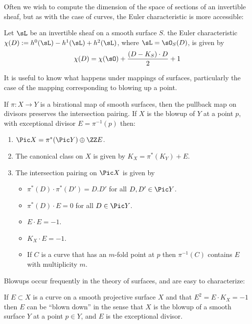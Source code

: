 Often we wish to compute the dimension of the space of sections of an invertible sheaf, but
as with the case of curves, the Euler characteristic is more accessible:

\begin{theorem} Let $\sL$ be an invertible sheaf on a smooth surface $S$.
the Euler characteristic $\chi(D) := h^0(\sL)-h^1(\sL)+h^2(\sL)$, where $\sL = \sO_S(D)$, is given by
$$
\chi(D) = \chi(\sO) + \frac{(D-K_S)\cdot D}{2}+1
$$
\end{theorem}


It is useful to know what happens under mappings of surfaces, particularly the case of the mapping
corresponding to blowing up a point.

\begin{theorem}
If $\pi: X \to Y$ is a birational map of smooth surfaces, then the pullback map on divisors
preserves the intersection pairing. If $X$ is the blowup of $Y$ at a point $p$, with exceptional
divisor $E = \pi^{-1}(p)$ then:

\begin{enumerate}
 \item $\Pic X =\pi^*(\Pic Y) \oplus \ZZ E$.
\item The canonical class on $X$ is given by $K_X = \pi^*(K_Y)+E$.
 \item The intersection pairing on $\Pic X$ is given by
 
\begin{itemize}
\item $\pi^*(D)\cdot\pi^*(D') = D.D'$ for all $D,D'\in \Pic Y$.
\item $\pi^*(D)\cdot E = 0$ for all $D\in \Pic Y$.
 \item $E\cdot E = -1$.
 \item $K_X\cdot E = -1$.
 \item If $C$ is a curve that has an $m$-fold point at $p$ then $\pi^{-1}(C)$ contains $E$ with multiplicity $m$.
 \end{itemize}
\end{enumerate}
\end{theorem}

Blowups occur frequently in the theory of surfaces, and are easy to characterize:
\begin{theorem}
If $E\subset X$ is a curve on a smooth projective surface $X$ and
 that $E^2 = E\cdot K_X = -1$ then $E$ can be ``blown down'' in the sense that
 $X$ is the blowup of a smooth surface $Y$ at a point $p\in Y$, and $E$ is the exceptional divisor.
\end{theorem}

